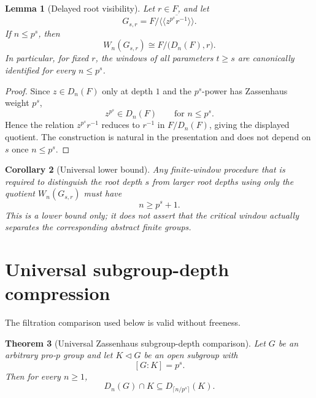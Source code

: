 \documentclass[11pt]{article}
\newtheorem{theorem}{Theorem}[section]
\newtheorem{lemma}[theorem]{Lemma}
\newtheorem{corollary}[theorem]{Corollary}
\newcommand{\F}{F}
\newcommand{\Dn}{D_n}
\newcommand{\Wn}{W_n}
\begin{document}
\begin{lemma}[Delayed root visibility]
Let \(r\in\F\), and let
\[
G_{s,r}=\F/
\overline{\langle\!\langle z^{p^s}r^{-1}\rangle\!\rangle}.
\]
If \(n\le p^s\), then
\[
\boxed{
\Wn(G_{s,r})
\cong
\F/\bigl(\Dn(\F),r\bigr).
}
\]
In particular, for fixed \(r\), the windows of all parameters \(t\ge s\)
are canonically identified for every \(n\le p^s\).
\end{lemma}

\begin{proof}
Since \(z\in\Dn(\F)\) only at depth $1$ and the $p^s$-power has
Zassenhaus weight $p^s$,
\[
z^{p^s}\in\Dn(\F)
\qquad\text{for }n\le p^s.
\]
Hence the relation
\(z^{p^s}r^{-1}\) reduces to \(r^{-1}\) in
\(\F/\Dn(\F)\), giving the displayed quotient.  The construction is
natural in the presentation and does not depend on $s$ once
\(n\le p^s\).
\end{proof}

\begin{corollary}[Universal lower bound]
Any finite-window procedure that is required to distinguish the root
depth \(s\) from larger root depths using only the quotient
\(\Wn(G_{s,r})\) must have
\[
n\ge p^s+1.
\]
This is a lower bound only; it does not assert that the critical window
actually separates the corresponding abstract finite groups.
\end{corollary}

\section{Universal subgroup-depth compression}

The filtration comparison used below is valid without freeness.

\begin{theorem}[Universal Zassenhaus subgroup-depth comparison]
Let $G$ be an arbitrary pro-$p$ group and let $K\triangleleft G$ be an open subgroup with
\[
[G:K]=p^s.
\]
Then for every $n\ge1$,
\[
\boxed{
D_n(G)\cap K\subseteq D_{\lceil n/p^s\rceil}(K).
}
\tag{SC$_s$}
\]
\end{theorem}
\end{document}
